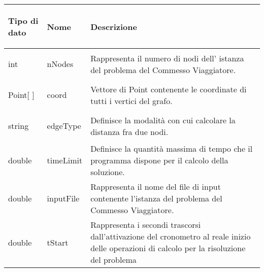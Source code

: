 \documentclass[11pt]{article}
\begin{document}
\begin{center}

    \begin{longtable}{ | p{4cm} | p{4cm} | p{7cm} |}
    \hline
    \begin{center} \textbf{Tipo di dato} \end{center} & \begin{center}  \textbf{Nome} \end{center}& 
    \begin{center} \textbf{Descrizione} \end{center}\\ \hline
    \begin{center} int \end{center} & \begin{center} nNodes \end{center}& \vfill Rappresenta il numero di nodi dell' istanza del problema del Commesso Viaggiatore.\vfill \\ \hline
    \begin{center} Point[ ] \end{center} & \begin{center} coord \end{center}& \vfill Vettore di Point contenente le coordinate di tutti i vertici del grafo.\vfill\\ \hline
    \begin{center} string \end{center} & \begin{center} edgeType \end{center}&\vfill Definisce la modalità con cui calcolare la distanza fra due nodi.\vfill \\ \hline
    \begin{center} double \end{center} & \begin{center} timeLimit \end{center}& \vfill Definisce la quantità massima di tempo che il programma dispone per il calcolo della soluzione.\vfill \\ \hline
    \begin{center} double \end{center} & \begin{center} inputFile \end{center}&\vfill Rappresenta il nome del file di input contenente l'istanza del problema del Commesso Viaggiatore. \vfill\\ \hline
    \begin{center} double \end{center} & \begin{center} tStart \end{center}& \vfill Rappresenta i secondi trascorsi dall'attivazione del cronometro al reale inizio delle operazioni di calcolo per la risoluzione del problema \vfill \\ \hline

\end{longtable}
\end{center}
\end{document}
